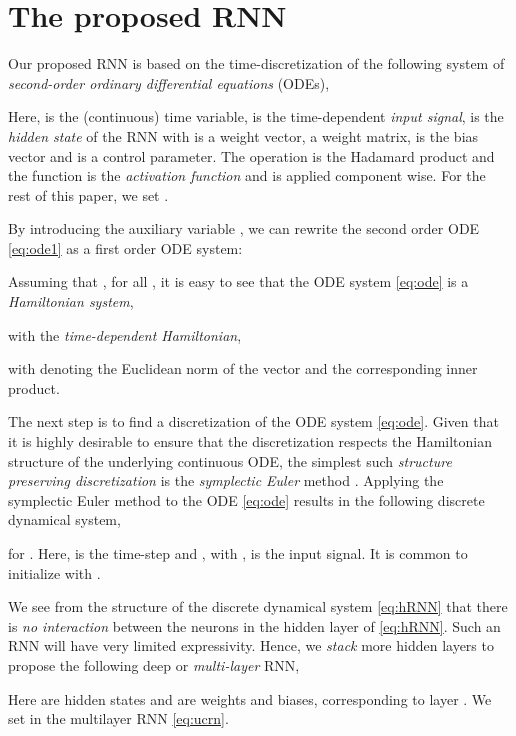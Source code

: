\documentclass{article}
\begin{document}
\section{The proposed RNN}
Our proposed RNN is based on the time-discretization of the following system of \emph{second-order ordinary differential equations} (ODEs),

Here,  is the (continuous) time variable,  is the time-dependent \emph{input signal},  is the \emph{hidden state} of the RNN with  is a weight vector,  a weight matrix,
 is the bias vector and  is a control parameter. The operation  is the Hadamard product and the function  is the \emph{activation function} and is applied component wise. For the rest of this paper, we set .

By introducing the auxiliary variable , we can rewrite the second order ODE \eqref{eq:ode1} as a first order ODE system:


Assuming that , for all , it is easy to see that the ODE system \eqref{eq:ode} is a \emph{Hamiltonian system},

with the \emph{time-dependent Hamiltonian},

with  denoting the Euclidean norm of the vector  and  the corresponding inner product.

The next step is to find a discretization of the ODE system \eqref{eq:ode}. Given that it is highly desirable to ensure that the discretization respects the Hamiltonian structure of the underlying continuous ODE, the simplest such \emph{structure preserving discretization} is the \emph{symplectic Euler} method \cite{ss1,HLW1}. Applying the symplectic Euler method to the ODE \eqref{eq:ode} results in the following discrete dynamical system,

for . Here,  is the time-step and , with , is the input signal. It is common to initialize with . 

We see from the structure of the discrete dynamical system \eqref{eq:hRNN} that there is \emph{no interaction} between the neurons in the hidden layer of \eqref{eq:hRNN}. Such an RNN will have very limited expressivity. Hence, we \emph{stack} more hidden layers to propose the following deep or \emph{multi-layer} RNN,

Here  are hidden states and  are weights and biases, corresponding to layer . We set  in the multilayer RNN \eqref{eq:ucrn}. 
\end{document}
